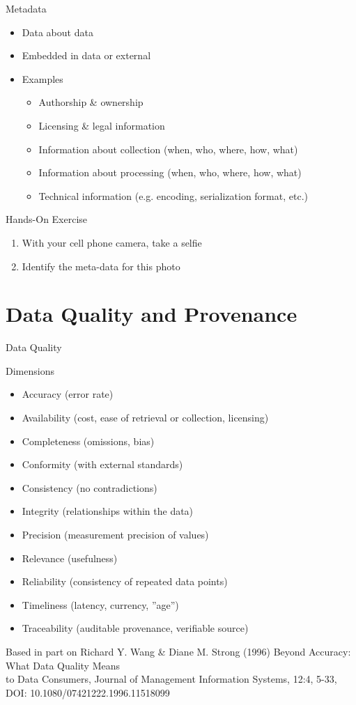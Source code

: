 \documentclass[ignorenonframetext,xcolor=x11names]{beamer}
\begin{document}
\begin{frame}{Metadata}
\begin{itemize}
	\item Data about data
	\item Embedded in data or external
	\item Examples
	\begin{itemize}
		\item Authorship \& ownership
		\item Licensing \& legal information
		\item Information about collection (when, who, where, how, what)
		\item Information about processing (when, who, where, how, what)
		\item Technical information (e.g. encoding, serialization format, etc.)
	\end{itemize}
\end{itemize}
\end{frame}

\begin{frame}{Hands-On Exercise}
\begin{enumerate}
	\item With your cell phone camera, take a selfie
	\item Identify the meta-data for this photo
\end{enumerate}
\end{frame}

\section{Data Quality and Provenance}

\begin{frame}{Data Quality}
\begin{block}{Dimensions}
\begin{itemize}
	\item Accuracy (error rate)
	\item Availability (cost, ease of retrieval or collection, licensing)
	\item Completeness (omissions, bias)
	\item Conformity (with external standards)
	\item Consistency (no contradictions)
	\item Integrity (relationships within the data)
	\item Precision (measurement precision of values)
	\item Relevance (usefulness)
	\item Reliability (consistency of repeated data points)
	\item Timeliness (latency, currency, ''age'')
	\item Traceability (auditable provenance, verifiable source)
\end{itemize}
\end{block}
\tiny{Based in part on Richard Y. Wang \& Diane M. Strong (1996) Beyond Accuracy: What Data Quality Means \\ to Data Consumers, Journal of Management Information Systems, 12:4, 5-33, \\ DOI: 10.1080/07421222.1996.11518099 }
\end{frame}
\end{document}
